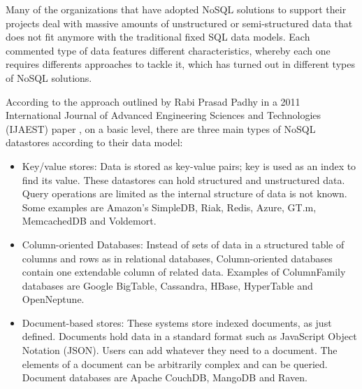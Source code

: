 Many of the organizations that have adopted NoSQL solutions to support their projects deal with massive amounts of unstructured or semi-structured data that does not fit anymore with the traditional fixed SQL data models. Each commented type of data features different characteristics, whereby each one requires differents approaches to tackle it, which has turned out in different types of NoSQL solutions.
\par
According to the approach outlined by Rabi Prasad Padhy in a 2011 International Journal of Advanced Engineering Sciences and Technologies (IJAEST) paper \cite{padhy2011rdbms}, on a basic level, there are three main types of NoSQL datastores according to their data model:
\begin{itemize}
\item Key/value stores: Data is stored as key-value pairs; key is used as an index to find its value. These datastores can hold structured and unstructured data. Query operations are limited as the internal structure of data is not known. Some examples are Amazon's SimpleDB, Riak, Redis, Azure, GT.m, MemcachedDB and Voldemort.
\item Column-oriented Databases: Instead of sets of data in a structured table of columns and rows as in relational databases, Column-oriented databases contain one extendable column of related data. Examples of ColumnFamily databases are Google BigTable, Cassandra, HBase, HyperTable and OpenNeptune.
\item Document-based stores: These systems store indexed documents, as just defined. Documents hold data in a standard format such as JavaScript Object Notation (JSON). Users can add whatever they need to a document. The elements of a document can be arbitrarily complex and can be queried. Document databases are Apache CouchDB, MangoDB and Raven.
\end{itemize}



